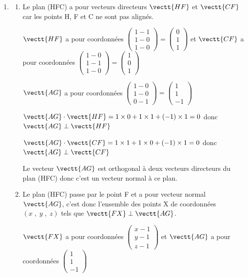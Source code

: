 \begin{enumerate}
\item 
	\begin{enumerate}
		\item 
Le plan (HFC) a pour vecteurs directeurs $\vectt{HF}$ et $\vectt{CF}$ car les points H, F et C ne sont pas alignés.		

$\vectt{HF}$ a pour coordonnées
$\begin{pmatrix}
1-1\\1-0\\1-0
\end{pmatrix}
=
\begin{pmatrix}
0\\1\\1
\end{pmatrix}$
et
$\vectt{CF}$ a pour coordonnées
$\begin{pmatrix}
1-0\\1-1\\1-0
\end{pmatrix}
=
\begin{pmatrix}
1\\0\\1
\end{pmatrix}$
		
$\vectt{AG}$ a pour coordonnées
$\begin{pmatrix}
1-0\\1-0\\0-1
\end{pmatrix}
=
\begin{pmatrix}
1\\1\\-1
\end{pmatrix}$		
	
$\vectt{AG}\cdot\vectt{HF}=1\times 0 + 1\times 1 + (-1)\times 1 = 0$
donc $\vectt{AG}\perp\vectt{HF}$
		
$\vectt{AG}\cdot\vectt{CF}=1\times 1 + 1\times 0 + (-1)\times 1 = 0$
donc $\vectt{AG}\perp\vectt{CF}$		

Le vecteur $\vectt{AG}$ est orthogonal à deux vecteurs directeurs du plan (HFC) donc c'est un vecteur normal à ce plan.
		
		\item 
Le plan (HFC) passe par le point F et a pour vecteur normal $\vectt{AG}$, c'est donc l'ensemble des points X de coordonnées $(x\;,\;y\;,\;z)$ tels que 
$\vectt{FX}\perp\vectt{AG}$.		
		
$\vectt{FX}$ a pour coordonnées
$\begin{pmatrix}
x-1\\y-1\\z-1
\end{pmatrix}$
et $\vectt{AG}$ a pour coordonnées
$\begin{pmatrix}
1\\1\\-1
\end{pmatrix}$


\end{enumerate}
\end{enumerate}

